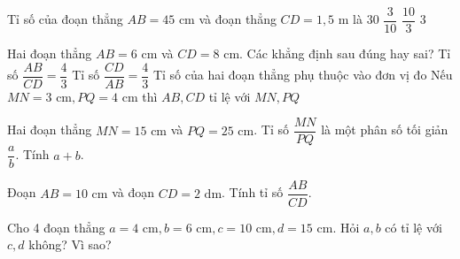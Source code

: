 \begin{ex}%
	Tỉ số của đoạn thẳng $AB = 45\text{ cm}$ và đoạn thẳng $CD = 1{,}5\text{ m}$ là
	\choice
	{$30$}
	{\True $\dfrac{3}{10}$}
	{$\dfrac{10}{3}$}
	{$3$}
\end{ex}

\begin{ex}%
	Hai đoạn thẳng $AB = 6\text{ cm}$ và $CD = 8\text{ cm}$. Các khẳng định sau đúng hay sai?
	\choiceTF
	{Tỉ số $\dfrac{AB}{CD} = \dfrac{4}{3}$}
	{\True Tỉ số $\dfrac{CD}{AB} = \dfrac{4}{3}$}
	{Tỉ số của hai đoạn thẳng phụ thuộc vào đơn vị đo}
	{\True Nếu $MN = 3\text{ cm}, PQ = 4\text{ cm}$ thì $AB, CD$ tỉ lệ với $MN, PQ$}
\end{ex}

\begin{bt}%
	Hai đoạn thẳng $MN = 15\text{ cm}$ và $PQ = 25\text{ cm}$. Tỉ số $\dfrac{MN}{PQ}$ là một phân số tối giản $\dfrac{a}{b}$. Tính $a+b$.
\end{bt}

\begin{bt}%
	Đoạn $AB=10\text{ cm}$ và đoạn $CD=2\text{ dm}$. Tính tỉ số $\dfrac{AB}{CD}$.
\end{bt}

\begin{bt}%
	Cho 4 đoạn thẳng $a = 4\text{ cm}, b = 6\text{ cm}, c = 10\text{ cm}, d = 15\text{ cm}$. Hỏi $a, b$ có tỉ lệ với $c, d$ không? Vì sao?
\end{bt}

